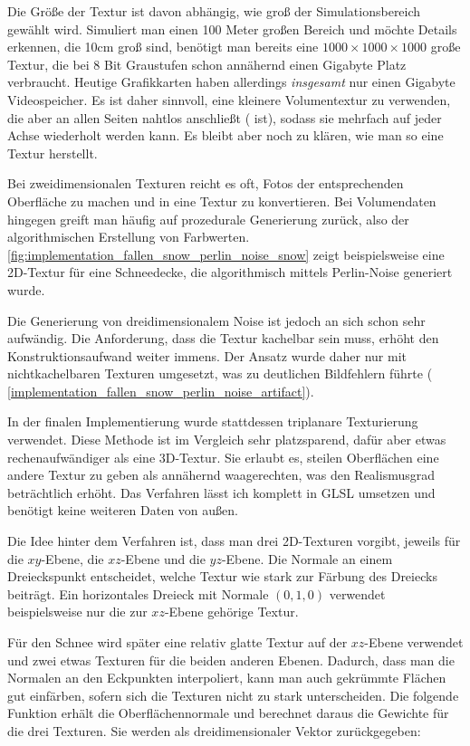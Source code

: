 Die Größe der Textur ist davon abhängig, wie groß der
Simulationsbereich gewählt wird. Simuliert man einen 100 Meter großen
Bereich und möchte Details erkennen, die 10cm groß sind, benötigt man
bereits eine $1000 \times 1000 \times 1000$ große Textur, die bei 8
Bit Graustufen schon annähernd einen Gigabyte Platz
verbraucht. Heutige Grafikkarten haben allerdings \emph{insgesamt} nur
einen Gigabyte Videospeicher. Es ist daher sinnvoll, eine kleinere
Volumentextur zu verwenden, die aber an allen Seiten nahtlos
anschließt ( ist), sodass sie mehrfach auf
jeder Achse wiederholt werden kann. Es bleibt aber noch zu klären, wie
man so eine Textur herstellt.

Bei zweidimensionalen Texturen reicht es oft, Fotos der entsprechenden
Oberfläche zu machen und in eine Textur zu konvertieren. Bei
Volumendaten hingegen greift man häufig auf prozedurale Generierung
zurück, also der algorithmischen Erstellung von
Farbwerten. \autoref{fig:implementation_fallen_snow_perlin_noise_snow}
zeigt beispielsweise eine 2D-Textur für eine Schneedecke, die
algorithmisch mittels Perlin-Noise\cite{Perlin:2002:IN:566654.566636}
generiert wurde.

Die Generierung von dreidimensionalem Noise ist jedoch an sich schon
sehr aufwändig. Die Anforderung, dass die Textur kachelbar sein muss,
erhöht den Konstruktionsaufwand weiter immens. Der Ansatz wurde daher
nur mit nichtkachelbaren Texturen umgesetzt, was zu deutlichen
Bildfehlern führte (\Pimiddyvgl
\autoref{implementation_fallen_snow_perlin_noise_artifact}).

In der finalen Implementierung wurde stattdessen triplanare
Texturierung verwendet. Diese Methode ist im Vergleich sehr
platzsparend, dafür aber etwas rechenaufwändiger als eine
3D-Textur. Sie erlaubt es, steilen Oberflächen eine andere Textur zu
geben als annähernd waagerechten, was den Realismusgrad beträchtlich
erhöht. Das Verfahren lässt ich komplett in GLSL umsetzen und benötigt
keine weiteren Daten von außen.

Die Idee hinter dem Verfahren ist, dass man drei 2D-Texturen vorgibt,
jeweils für die $xy$-Ebene, die $xz$-Ebene und die $yz$-Ebene. Die
Normale an einem Dreieckspunkt entscheidet, welche Textur wie stark
zur Färbung des Dreiecks beiträgt. Ein horizontales Dreieck mit
Normale $(0,1,0)$ verwendet beispielsweise nur die zur $xz$-Ebene
gehörige Textur.

Für den Schnee wird später eine relativ glatte Textur auf der
$xz$-Ebene verwendet und zwei etwas  Texturen
für die beiden anderen Ebenen. Dadurch, dass man die Normalen an den
Eckpunkten interpoliert, kann man auch gekrümmte Flächen gut
einfärben, sofern sich die Texturen nicht zu stark unterscheiden. Die
folgende Funktion erhält die Oberflächennormale und berechnet daraus
die Gewichte für die drei Texturen. Sie werden als dreidimensionaler
Vektor zurückgegeben:

